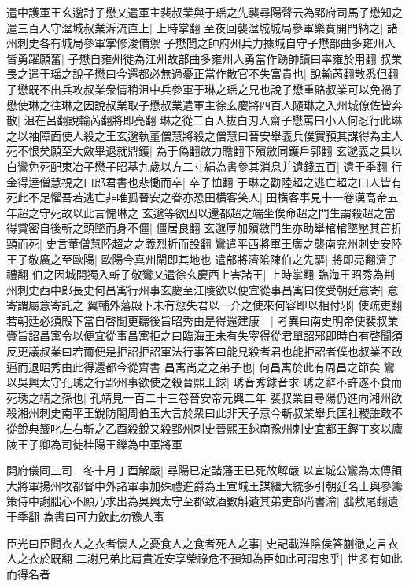 遣中護軍王玄邈討子懋又遣軍主裴叔業與于瑶之先襲尋陽聲云為郢府司馬子懋知之遣三百人守湓城叔業泝流直上|{
	上時掌翻}
至夜回襲湓城城局參軍樂賁開門納之|{
	諸州刺史各有城局參軍掌修浚備禦}
子懋聞之帥府州兵力據城自守子懋部曲多雍州人皆勇躍願奮|{
	子懋自雍州徙為江州故部曲多雍州人勇當作踴帥讀曰率雍於用翻}
叔業畏之遣于瑶之說子懋曰今還都必無過憂正當作散官不失富貴也|{
	說輸芮翻散悉但翻}
子懋既不出兵攻叔業衆情稍沮中兵參軍于琳之瑶之兄也說子懋重賂叔業可以免禍子懋使琳之往琳之因說叔業取子懋叔業遣軍主徐玄慶將四百人隨琳之入州城僚佐皆奔散|{
	沮在呂翻說輸芮翻將即亮翻}
琳之從二百人拔白刃入齋子懋罵曰小人何忍行此琳之以袖障面使人殺之王玄邈執董僧慧將殺之僧慧曰晉安舉義兵僕實預其謀得為主人死不恨矣願至大斂畢退就鼎鑊|{
	為于偽翻斂力贍翻下殯斂同鑊戶郭翻}
玄邈義之具以白鸞免死配東冶子懋子昭基九歲以方二寸絹為書參其消息并遺錢五百|{
	遺于季翻}
行金得逹僧慧視之曰郎君書也悲慟而卒|{
	卒子恤翻}
于琳之勸陸超之逃亡超之曰人皆有死此不足懼吾若逃亡非唯孤晉安之眷亦恐田横客笑人|{
	田横客事見十一卷漢高帝五年超之守死故以此言愧琳之}
玄邈等欲囚以還都超之端坐俟命超之門生謂殺超之當得賞密自後斬之頭墜而身不僵|{
	僵居良翻}
玄邈厚加殯斂門生亦助舉棺棺墜壓其首折頸而死|{
	史言董僧慧陸超之之義烈折而設翻}
鸞遣平西將軍王廣之襲南兖州刺史安陸王子敬廣之至歐陽|{
	歐陽今真州閘即其地也}
遣部將濟隂陳伯之先驅|{
	將即亮翻濟子禮翻}
伯之因城開獨入斬子敬鸞又遣徐玄慶西上害諸王|{
	上時掌翻}
臨海王昭秀為荆州刺史西中郎長史何昌㝢行州事玄慶至江陵欲以便宜從事昌㝢曰僕受朝廷意寄|{
	意寄謂屬意寄託之}
翼輔外藩殿下未有愆失君以一介之使來何容即以相付邪|{
	使疏吏翻}
若朝廷必須殿下當自啓聞更聽後旨昭秀由是得還建康　|{
	考異曰南史明帝使裴叔業賫旨詔昌㝢令以便宜從事昌㝢拒之曰臨海王未有失寜得從君單詔邪即時自有啓聞須反更議叔業曰若爾便是拒詔拒詔軍法行事答曰能見殺者君也能拒詔者僕也叔業不敢逼而退昭秀由此得還都今從齊書}
昌㝢尚之之弟子也|{
	何昌㝢於此有周昌之節矣}
鸞以吳興太守孔琇之行郢州事欲使之殺晉熙王銶|{
	琇音秀銶音求}
琇之辭不許遂不食而死琇之靖之孫也|{
	孔靖見一百二十三卷晉安帝元興二年}
裴叔業自尋陽仍進向湘州欲殺湘州刺史南平王銳防閤周伯玉大言於衆曰此非天子意今斬叔業舉兵匡社稷誰敢不從銳典籖叱左右斬之乙酉殺銳又殺郢州刺史晉熙王銶南豫州刺史宜都王鏗丁亥以廬陵王子卿為司徒桂陽王鑠為中軍將軍

開府儀同三司　冬十月丁酉解嚴|{
	尋陽已定諸藩王已死故解嚴}
以宣城公鸞為太傅領大將軍揚州牧都督中外諸軍事加殊禮進爵為王宣城王謀繼大統多引朝廷名士與參籌策侍中謝朏心不願乃求出為吳興太守至郡致酒數斛遺其弟吏部尚書瀹|{
	朏敷尾翻遺于季翻}
為書曰可力飲此勿豫人事

臣光曰臣聞衣人之衣者懷人之憂食人之食者死人之事|{
	史記載淮陰侯答蒯徹之言衣人之衣於既翻}
二謝兄弟比肩貴近安享榮祿危不預知為臣如此可謂忠乎|{
	世多有如此而得名者}


